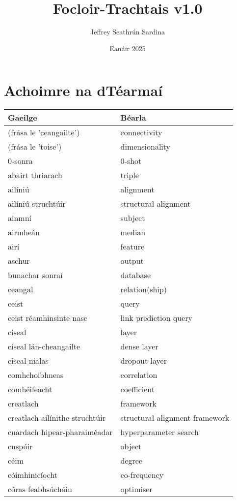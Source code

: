 \documentclass{article}
\title{Focloir-Trachtais v1.0}
\author{Jeffrey Seathrún Sardina}
\date{Eanáir 2025}
\begin{document}
            \maketitle
        
\section{Achoimre na dTéarmaí}\begin{longtable}{|l|l|}
	\hline
		\textbf{Gaeilge} & \textbf{Béarla}\\ \hline 
		(frása le 'ceangailte')&connectivity\\ \hline 
		(frása le 'toise')&dimensionality\\ \hline 
		0-sonra&0-shot\\ \hline 
		abairt thriarach&triple\\ \hline 
		ailíniú&alignment\\ \hline 
		ailíniú struchtúir&structural alignment\\ \hline 
		ainmní&subject\\ \hline 
		airmheán&median\\ \hline 
		airí&feature\\ \hline 
		aschur&output\\ \hline 
		bunachar sonraí&database\\ \hline 
		ceangal&relation(ship)\\ \hline 
		ceist&query\\ \hline 
		ceist réamhinsinte nasc&link prediction query\\ \hline 
		ciseal&layer\\ \hline 
		ciseal lán-cheangailte&dense layer\\ \hline 
		ciseal nialas&dropout layer\\ \hline 
		comhchoibhneas&correlation\\ \hline 
		comhéifeacht&coefficient\\ \hline 
		creatlach&framework\\ \hline 
		creatlach ailínithe struchtúir&structural alignment framework\\ \hline 
		cuardach hipear-pharaiméadar&hyperparameter search\\ \hline 
		cuspóir&object\\ \hline 
		céim&degree\\ \hline 
		cóimhinicíocht&co-frequency\\ \hline 
		córas feabhsúcháin&optimiser\\ \hline 

\end{longtable}
\end{document}
